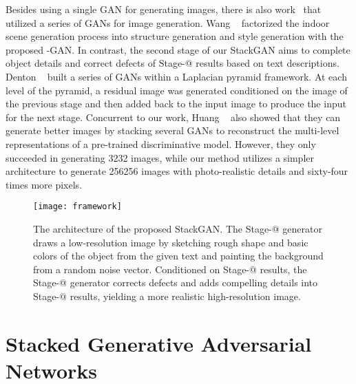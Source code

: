 \documentclass[10pt,twocolumn,letterpaper]{article}
\makeatletter
\newcommand{\Rmnum}[1]{\expandafter\@slowromancap\romannumeral #1@}
\makeatother
\begin{document}
Besides using a single GAN for generating images, there is also work~\cite{WangG16, DentonCSF15,huang2016sgan} that utilized a series of GANs for image generation. Wang \etal~\cite{WangG16} factorized the indoor scene generation process into structure generation and style generation with the proposed -GAN. In contrast, the second stage of our StackGAN aims to complete object details and correct defects of Stage-\Rmnum{1} results based on text descriptions. Denton \etal~\cite{DentonCSF15} built a series of GANs within a Laplacian pyramid framework. At each level of the pyramid, a residual image was generated conditioned on the image of the previous stage and then added back to the input image to produce the input for the next stage. Concurrent to our work, Huang \etal~\cite{huang2016sgan} also showed that they can generate better images by stacking several GANs to reconstruct the multi-level representations of a pre-trained discriminative model. However, they only succeeded in generating 3232 images, while our method utilizes a simpler architecture to generate 256256 images with photo-realistic details and sixty-four times more pixels.


\begin{figure*}[tb]
\begin{center}
\texttt{[image: framework]}
\caption{The architecture of the proposed StackGAN. The Stage-\Rmnum{1} generator draws a low-resolution image by sketching rough shape and basic colors of the object from the given text and painting the background from a random noise vector. Conditioned on Stage-\Rmnum{1} results, the Stage-\Rmnum{2} generator corrects defects and adds compelling details into Stage-\Rmnum{1} results, yielding a more realistic high-resolution image.
   }
	\vspace{-12pt}
\end{center}
\label{fig:framework}
\end{figure*}


\vspace{-2pt}
\section{Stacked Generative Adversarial Networks}
\vspace{-5pt}
\end{document}

